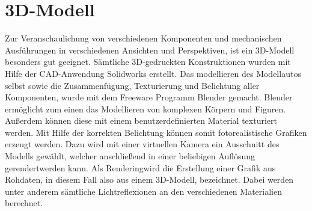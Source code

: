 \section{3D-Modell}
\label{sec:3Dmodel}
Zur Veranschaulichung von verschiedenen Komponenten und mechanischen Ausführungen in verschiedenen Ansichten und Perspektiven, ist ein 3D-Modell besonders gut geeignet. Sämtliche 3D-gedruckten Konstruktionen wurden mit Hilfe der \ac{CAD}-Anwendung Solidworks erstellt. Das modellieren des Modellautos selbst sowie die Zusammenfügung, Texturierung und Belichtung aller Komponenten, wurde mit dem Freeware Programm Blender gemacht. Blender ermöglicht zum einen das Modellieren von komplexen Körpern und Figuren. Außerdem können diese mit einem benutzerdefinierten Material texturiert werden. Mit Hilfe der korrekten Belichtung können somit fotorealistische Grafiken erzeugt werden. Dazu wird mit einer virtuellen Kamera ein Ausschnitt des Modells gewählt, welcher anschließend in einer beliebigen Auflösung \glqq gerendert\grqq werden kann. Als \glqq Rendering\grqq wird die Erstellung einer Grafik aus Rohdaten, in diesem Fall also aus einem 3D-Modell, bezeichnet. Dabei werden unter anderem sämtliche Lichtreflexionen an den verschiedenen Materialien berechnet.